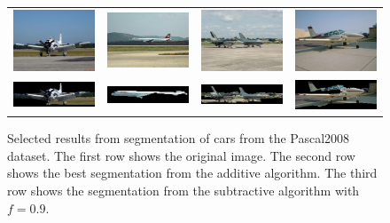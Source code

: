 \documentclass[10pt,twocolumn,letterpaper]{article}
\begin{document}
\begin{figure}[p]
\centering
\begin{tabular}{ p{3cm} p{3cm} p{3cm} p{3cm} }
\includegraphics[width=2.95cm]{figures/add_res/plane/2008_000021.jpg.eps} &
\includegraphics[width=2.95cm]{figures/add_res/plane/2008_001971.jpg.eps} &
\includegraphics[width=2.95cm]{figures/add_res/plane/2008_002673.jpg.eps} &
\includegraphics[width=2.95cm]{figures/add_res/plane/2008_002138.jpg.eps} \\
\includegraphics[width=2.95cm]{figures/add_res/plane/2008_000021.jpg_2_good.jpg.eps} &
\includegraphics[width=2.95cm]{figures/add_res/plane/2008_001971.jpg_2_good.jpg.eps} &
\includegraphics[width=2.95cm]{figures/add_res/plane/2008_002673.jpg_2_good.jpg.eps} &
\includegraphics[width=2.95cm]{figures/add_res/plane/2008_002138.jpg_2_good.jpg.eps} \\
\end{tabular}
\caption{Selected results from segmentation of cars from the Pascal2008
dataset.  The first row shows the original image.  The second row shows
the best segmentation from the additive algorithm.  The third row shows
the segmentation from the subtractive algorithm with $f=0.9$.}
\label{fig:aeroplane_good_results}
\end{figure}
\end{document}
